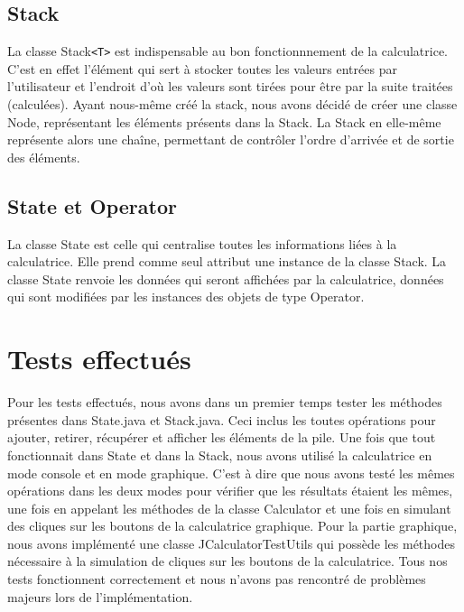 \documentclass[12pt]{report}
\begin{document}
    \subsection*{Stack}
        La classe Stack\verb|<T>| est indispensable au bon fonctionnnement de la calculatrice. C'est en effet l'élément qui
    sert à stocker toutes les valeurs entrées par l'utilisateur et l'endroit d'où les valeurs sont tirées pour être par la suite traitées (calculées).
    \newline Ayant nous-même créé la stack, nous avons décidé de créer une classe Node, représentant les éléments présents dans la Stack.
    La Stack en elle-même représente alors une chaîne, permettant de contrôler l'ordre d'arrivée et de sortie des éléments.

    \subsection*{State et Operator}
        La classe State est celle qui centralise toutes les informations liées à la calculatrice. Elle prend comme seul attribut
    une instance de la classe Stack. La classe State renvoie les données qui seront affichées par la calculatrice, données qui
    sont modifiées par les instances des objets de type Operator.





    \section*{Tests effectués}
    Pour les tests effectués, nous avons dans un premier temps tester les méthodes présentes dans State.java et Stack.java.
    Ceci inclus les toutes opérations pour ajouter, retirer, récupérer et afficher les éléments de la pile.
    \newline
    Une fois que tout fonctionnait dans State et dans la Stack, nous avons utilisé la calculatrice en mode console et en
    mode graphique. C'est à dire que nous avons testé les mêmes opérations dans les deux modes pour vérifier que les
    résultats étaient les mêmes, une fois en appelant les méthodes de la classe Calculator et une fois en simulant des
    cliques sur les boutons de la calculatrice graphique. Pour la partie graphique, nous avons implémenté une classe
    JCalculatorTestUtils qui possède les méthodes nécessaire à la simulation de cliques sur les boutons de la calculatrice.
    \newline
    Tous nos tests fonctionnent correctement et nous n'avons pas rencontré de problèmes majeurs lors de l'implémentation.
\end{document}
